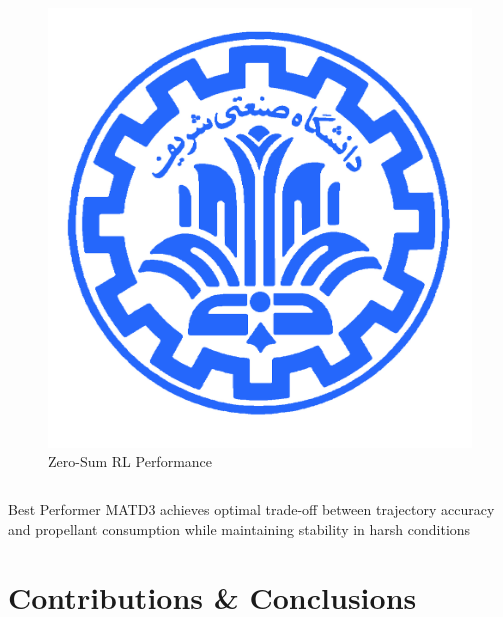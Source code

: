\documentclass[
    11pt, %
    aspectratio=169, %
]{beamer}
\begin{document}
\begin{frame}
\begin{columns}[t]
\begin{column}{0.5\textwidth}
\begin{figure}
				\includegraphics[width=\textwidth]{multi_agent_comparison.png}
				\caption{Zero-Sum RL Performance}
			\end{figure}
		\end{column}
	\end{columns}
	
	\begin{exampleblock}{Best Performer}
		MATD3 achieves optimal trade-off between trajectory accuracy and propellant consumption while maintaining stability in harsh conditions
	\end{exampleblock}
\end{frame}



\section{Contributions \& Conclusions}
\end{document}
